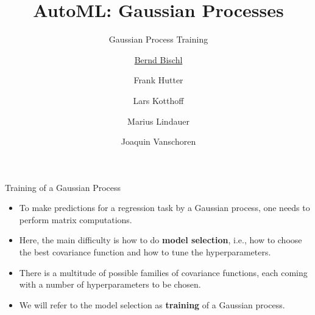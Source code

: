 



\newcommand{\lz}{\vspace{0.5cm}}
\newcommand{\thetab}{\bm{\weights}}
\newcommand{\zero}{\mathbf{0}}
\newcommand{\Xmat}{\mathbf{X}}
\newcommand{\ydat}{\mathbf{y}}
\newcommand{\id}{\boldsymbol{I}}
\newcommand{\Amat}{\mathbf{A}}
\newcommand{\Xspace}{\mathcal{X}}                                           
\newcommand{\Yspace}{\mathcal{Y}}
\newcommand{\ls}{\ell}
\newcommand{\natnum}{\mathbb{N}}
\newcommand{\intnum}{\mathbb{Z}}
\newcommand{\order}{\mathcal{O}}  

\usepackage{fontawesome}
\usepackage{dirtytalk}
\usepackage{csquotes}


\def\argmin{\mathop{\sf arg\,min}} 




\title[AutoML: GPs]{AutoML: Gaussian Processes} %
\subtitle{Gaussian Process Training} %
\author[Marius Lindauer]{\underline{Bernd Bischl} \and Frank Hutter \and Lars Kotthoff\newline \and Marius Lindauer \and Joaquin Vanschoren}
\institute{}
\date{}




\maketitle
	


\begin{frame}[c]{Training of a Gaussian Process}

\begin{itemize}
\vspace{.5cm}
\item To make predictions for a regression task by a Gaussian process, one needs to perform matrix computations. 
\vspace{.5cm}
\item Here, the main difficulty is how to do \textbf{model selection}, i.e., how to choose the best covariance function and how to tune the hyperparameters. 
\vspace{.5cm}
\item There is a multitude of possible families of covariance functions, each coming with a number of hyperparameters to be chosen.
\vspace{.5cm}
\item We will refer to the model selection as \textbf{training} of a Gaussian process.
\end{itemize}


\end{frame}

